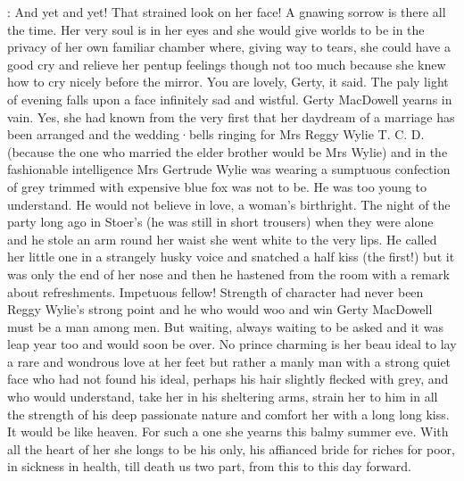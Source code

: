 :
And yet and yet!
That strained look on her face!
A gnawing sorrow is
there all the time.
Her very soul is in her eyes and she would give worlds
to be in the privacy of her own familiar chamber
where,
giving way to
tears,
she could have a good cry and relieve her pentup feelings
though not
too much because she knew how to cry nicely before the mirror.
You are
lovely,
Gerty,
it said.
The paly light of evening falls upon a face
infinitely sad and wistful.
Gerty MacDowell yearns in vain.
Yes,
she had
known from the very first that her daydream of a marriage has been
arranged and the wedding·bells ringing for Mrs Reggy Wylie T.
C.
D.
(because the one who married the elder brother would be Mrs Wylie) and in
the fashionable intelligence Mrs Gertrude Wylie was wearing a sumptuous
confection of grey trimmed with expensive blue fox was not to be.
He was
too young to understand.
He would not believe in love,
a woman's
birthright.
The night of the party long ago in Stoer's (he was still in
short trousers) when they were alone and he stole an arm round her waist
she went white to the very lips.
He called her little one in a strangely
husky voice and snatched a half kiss (the first!) but it was only the end
of her nose and then he hastened from the room with a remark about
refreshments.
Impetuous fellow!
Strength of character had never been Reggy
Wylie's strong point and he who would woo and win Gerty MacDowell must be
a man among men.
But waiting,
always waiting to be asked and it was leap
year too and would soon be over.
No prince charming is her beau ideal to
lay a rare and wondrous love at her feet
but rather a manly man with a
strong quiet face who had not found his ideal,
perhaps his hair slightly
flecked with grey,
and who would understand,
take her in his sheltering
arms,
strain her to him in all the strength of his deep passionate nature
and comfort her with a long long kiss.
It would be like heaven.
For such
a one she yearns this balmy summer eve.
With all the heart of her she
longs to be his only,
his affianced bride for riches for poor,
in sickness
in health,
till death us two part,
from this to this day forward.

